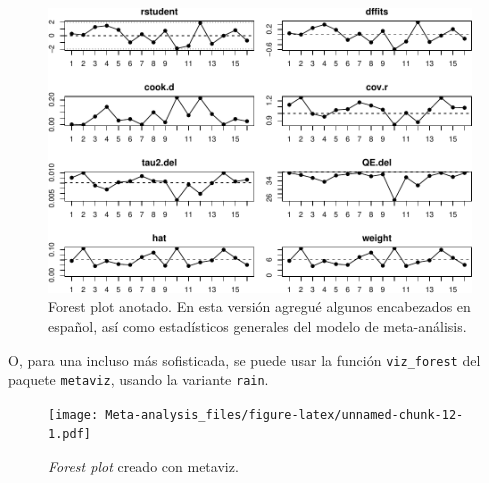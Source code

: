 \documentclass[
]{article}
\newenvironment{Shaded}{\begin{snugshade}}{\end{snugshade}}
\newcommand{\AttributeTok}[1]{\textcolor[rgb]{0.80,0.80,0.80}{#1}}
\newcommand{\ConstantTok}[1]{\textcolor[rgb]{0.86,0.64,0.64}{\textbf{#1}}}
\newcommand{\FloatTok}[1]{\textcolor[rgb]{0.75,0.75,0.82}{#1}}
\newcommand{\FunctionTok}[1]{\textcolor[rgb]{0.94,0.94,0.56}{#1}}
\newcommand{\NormalTok}[1]{\textcolor[rgb]{0.80,0.80,0.80}{#1}}
\newcommand{\SpecialCharTok}[1]{\textcolor[rgb]{0.86,0.64,0.64}{#1}}
\newcommand{\StringTok}[1]{\textcolor[rgb]{0.80,0.58,0.58}{#1}}
\begin{document}
\begin{figure}
\centering
\includegraphics{Meta-analysis_files/figure-latex/unnamed-chunk-11-1.pdf}
\caption{Forest plot anotado. En esta versión agregué algunos
encabezados en español, así como estadísticos generales del modelo de
meta-análisis.}
\end{figure}

O, para una incluso más sofisticada, se puede usar la función
\texttt{viz\_forest} del paquete \texttt{metaviz}, usando la variante
\texttt{rain}.

\begin{Shaded}
\end{Shaded}

\begin{figure}
\centering
\texttt{[image: Meta-analysis\_files/figure-latex/unnamed-chunk-12-1.pdf]}
\caption{\emph{Forest plot} creado con metaviz.}
\end{figure}
\end{document}
